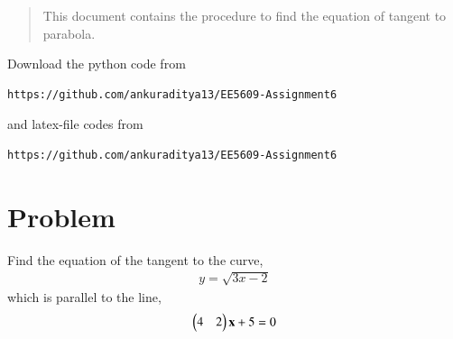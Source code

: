 \documentclass[journal,12pt,twocolumn]{IEEEtran}
\begin{document}
\begin{abstract}
This document contains the procedure to find the equation of tangent to parabola.
\end{abstract}
Download the python code from 
\begin{lstlisting}
https://github.com/ankuraditya13/EE5609-Assignment6
\end{lstlisting}
%
and latex-file codes from 
%
\begin{lstlisting}
https://github.com/ankuraditya13/EE5609-Assignment6
\end{lstlisting}

\section{Problem}
Find the equation of the tangent to the curve,
\begin{align}
y = \sqrt{3x-2}
\label{Q}
\end{align}
 which is parallel to the line,
\begin{align}
\begin{pmatrix}4&2\end{pmatrix}\mathbf{x}+5=0
\label{P}
\end{align}  
\end{document}
